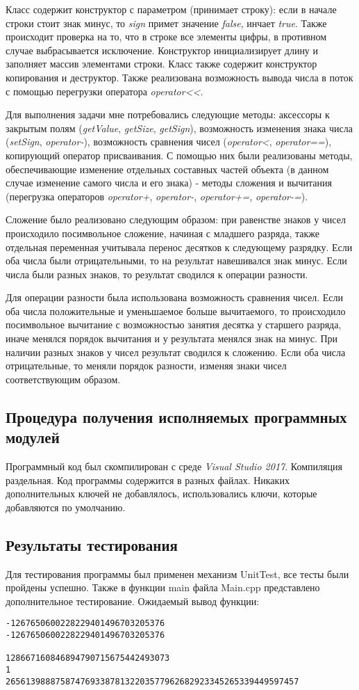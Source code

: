 \documentclass[a4paper,14pt]{article}
\begin{document}
Класс содержит конструктор с параметром (принимает строку): если в начале строки стоит знак минус, то \textit{sign} примет значение \textit{false}, инчает \textit{true}. Также происходит проверка на то, что в строке все элементы цифры, в противном случае выбрасывается исключение. Конструктор инициализирует длину и заполняет массив элементами строки. Класс также содержит конструктор копирования и деструктор. Также реализована возможность вывода числа в поток с помощью перегрузки оператора \textit{operator<<}.

Для выполнения задачи мне потребовались следующие методы: аксессоры к закрытым полям (\textit{getValue}, \textit{getSize}, \textit{getSign}), возможность изменения знака числа (\textit{setSign}, \textit{operator-}), возможность сравнения чисел (\textit{operator<}, \textit{operator==}), копирующий оператор присваивания. С помощью них были реализованы методы, обеспечивающие изменение отдельных составных частей объекта (в данном случае изменение самого числа и его знака) - методы сложения и вычитания (перегрузка операторов \textit{operator+},  \textit{operator-}, \textit{operator+=}, \textit{operator-=}). 

Сложение было реализовано следующим образом: при равенстве знаков у чисел происходило посимвольное сложение, начиная с младшего разряда, также отдельная переменная учитывала перенос десятков к следующему разрядку. Если оба числа были отрицательными, то на результат навешивался знак минус. Если числа были разных знаков, то результат сводился к операции разности.

Для операции разности была использована возможность сравнения чисел. Если оба числа положительные и уменьшаемое больше вычитаемого, то происходило посимвольное вычитание с возможностью занятия десятка у старшего разряда, иначе менялся порядок вычитания и у результата менялся знак на минус. При наличии разных знаков у чисел результат сводился к сложению. Если оба числа отрицательные, то меняли порядок разности, изменяя знаки чисел соответствующим образом.

\subsection{Процедура получения исполняемых программных модулей}
Программный код был скомпилирован с среде \textit{Visual Studio 2017}. Компиляция раздельная. Код программы содержится в разных файлах. Никаких дополнительных ключей не добавлялось, использовались ключи, которые добавляются по умолчанию.
\subsection{Результаты тестирования}
Для тестирования программы был применен механизм UnitTest, все тесты были пройдены успешно.
Также в функции main файла Main.cpp представлено дополнительное тестирование. Ожидаемый вывод функции: 
\begin{verbatim}
-1267650600228229401496703205376
-1267650600228229401496703205376

128667160846894790715675442493073
1
26561398887587476933878132203577962682923345265339449597457
\end{verbatim}
\end{document}
